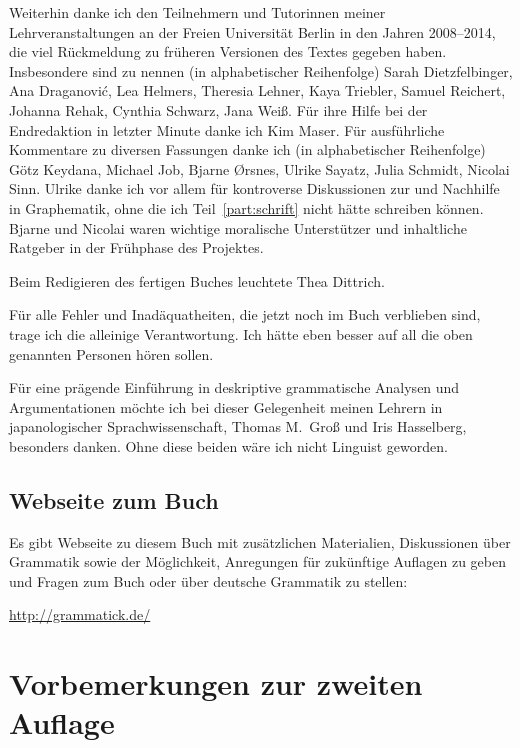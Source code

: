 Weiterhin danke ich den Teilnehmern und Tutorinnen meiner Lehrveranstaltungen an der Freien Universität Berlin in den Jahren 2008--2014, die viel Rückmeldung zu früheren Versionen des Textes gegeben haben.
Insbesondere sind zu nennen (in alphabetischer Reihenfolge) Sarah Dietzfelbinger, Ana Draganovi\'{c}, Lea Helmers, Theresia Lehner, Kaya Triebler, Samuel Reichert, Johanna Rehak, Cynthia Schwarz, Jana Weiß.
Für ihre Hilfe bei der Endredaktion in letzter Minute danke ich Kim Maser.
Für ausführliche Kommentare zu diversen Fassungen danke ich (in alphabetischer Reihenfolge) Götz Keydana, Michael Job, Bjarne Ørsnes, Ulrike Sayatz, Julia Schmidt, Nicolai Sinn.
Ulrike danke ich vor allem für kontroverse Diskussionen zur und Nachhilfe in Graphematik, ohne die ich Teil~\ref{part:schrift} nicht hätte schreiben können.
Bjarne und Nicolai waren wichtige moralische Unterstützer und inhaltliche Ratgeber in der Frühphase des Projektes.

Beim Redigieren des fertigen Buches leuchtete Thea Dittrich.

Für alle Fehler und Inadäquatheiten, die jetzt noch im Buch verblieben sind, trage ich die alleinige Verantwortung.
Ich hätte eben besser auf all die oben genannten Personen hören sollen.

Für eine prägende Einführung in deskriptive grammatische Analysen und Argumentationen möchte ich bei dieser Gelegenheit meinen Lehrern in japanologischer Sprachwissenschaft, Thomas M.\ Groß und Iris Hasselberg, besonders danken.
Ohne diese beiden wäre ich nicht Linguist geworden.

\section*{Webseite zum Buch}

Es gibt Webseite zu diesem Buch mit zusätzlichen Materialien, Diskussionen über Grammatik sowie der Möglichkeit, Anregungen für zukünftige Auflagen zu geben und Fragen zum Buch oder über deutsche Grammatik zu stellen:

\begin{center}
  \url{http://grammatick.de/}
\end{center}



\chapter*{Vorbemerkungen zur zweiten Auflage}


